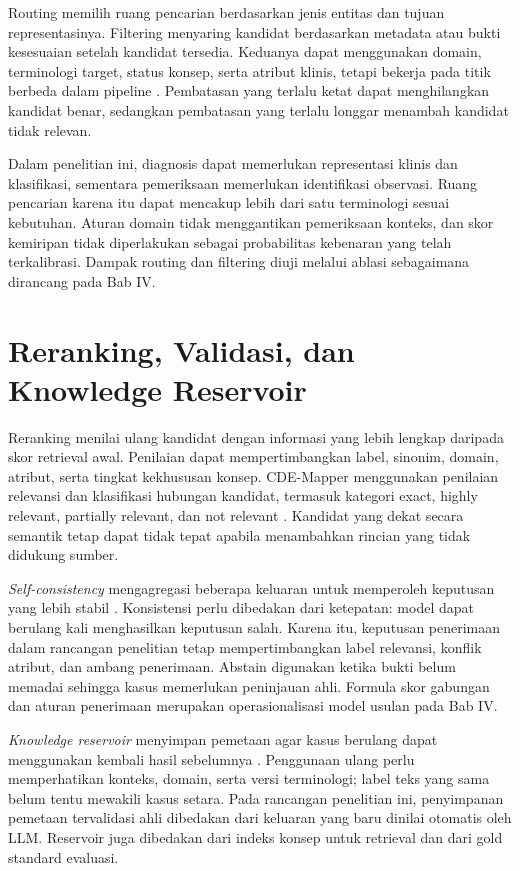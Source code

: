 Routing memilih ruang pencarian berdasarkan jenis entitas dan tujuan representasinya. Filtering menyaring kandidat berdasarkan metadata atau bukti kesesuaian setelah kandidat tersedia. Keduanya dapat menggunakan domain, terminologi target, status konsep, serta atribut klinis, tetapi bekerja pada titik berbeda dalam pipeline \citep{gilani_cde-mapper_2025}. Pembatasan yang terlalu ketat dapat menghilangkan kandidat benar, sedangkan pembatasan yang terlalu longgar menambah kandidat tidak relevan.

Dalam penelitian ini, diagnosis dapat memerlukan representasi klinis dan klasifikasi, sementara pemeriksaan memerlukan identifikasi observasi. Ruang pencarian karena itu dapat mencakup lebih dari satu terminologi sesuai kebutuhan. Aturan domain tidak menggantikan pemeriksaan konteks, dan skor kemiripan tidak diperlakukan sebagai probabilitas kebenaran yang telah terkalibrasi. Dampak routing dan filtering diuji melalui ablasi sebagaimana dirancang pada Bab IV.

\section{Reranking, Validasi, dan Knowledge Reservoir}

Reranking menilai ulang kandidat dengan informasi yang lebih lengkap daripada skor retrieval awal. Penilaian dapat mempertimbangkan label, sinonim, domain, atribut, serta tingkat kekhususan konsep. CDE-Mapper menggunakan penilaian relevansi dan klasifikasi hubungan kandidat, termasuk kategori exact, highly relevant, partially relevant, dan not relevant \citep{gilani_cde-mapper_2025}. Kandidat yang dekat secara semantik tetap dapat tidak tepat apabila menambahkan rincian yang tidak didukung sumber.

\textit{Self-consistency} mengagregasi beberapa keluaran untuk memperoleh keputusan yang lebih stabil \citep{wang_self-consistency_2023}. Konsistensi perlu dibedakan dari ketepatan: model dapat berulang kali menghasilkan keputusan salah. Karena itu, keputusan penerimaan dalam rancangan penelitian tetap mempertimbangkan label relevansi, konflik atribut, dan ambang penerimaan. Abstain digunakan ketika bukti belum memadai sehingga kasus memerlukan peninjauan ahli. Formula skor gabungan dan aturan penerimaan merupakan operasionalisasi model usulan pada Bab IV.

\textit{Knowledge reservoir} menyimpan pemetaan agar kasus berulang dapat menggunakan kembali hasil sebelumnya \citep{gilani_cde-mapper_2025}. Penggunaan ulang perlu memperhatikan konteks, domain, serta versi terminologi; label teks yang sama belum tentu mewakili kasus setara. Pada rancangan penelitian ini, penyimpanan pemetaan tervalidasi ahli dibedakan dari keluaran yang baru dinilai otomatis oleh LLM. Reservoir juga dibedakan dari indeks konsep untuk retrieval dan dari gold standard evaluasi.

